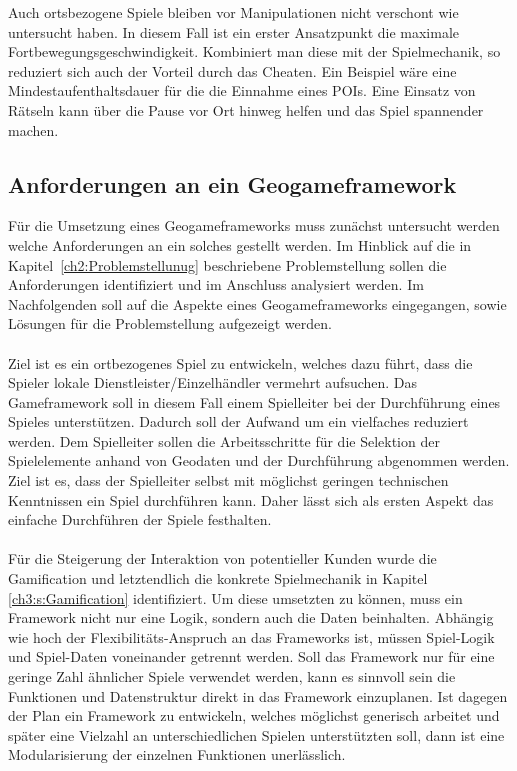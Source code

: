 Auch ortsbezogene Spiele bleiben vor Manipulationen nicht verschont wie \textcite{He.2011} untersucht haben.
In diesem Fall ist ein erster Ansatzpunkt die maximale Fortbewegungsgeschwindigkeit. Kombiniert man diese mit der Spielmechanik, so reduziert sich auch der \glqq Vorteil\grqq{} durch das Cheaten. Ein Beispiel wäre eine Mindestaufenthaltsdauer für die die Einnahme eines POIs.
Eine Einsatz von Rätseln kann über die Pause vor Ort hinweg helfen und das Spiel spannender machen.

\subsection*{Anforderungen an ein Geogameframework}

Für die Umsetzung eines Geogameframeworks muss zunächst untersucht werden welche Anforderungen an ein solches gestellt werden.
Im Hinblick auf die in Kapitel~\ref{ch2:Problemstellunug} beschriebene Problemstellung sollen die Anforderungen  identifiziert und im Anschluss analysiert werden.
Im Nachfolgenden soll auf die Aspekte eines Geogameframeworks eingegangen, sowie Lösungen für die Problemstellung aufgezeigt werden.
\\\\
Ziel ist es ein ortbezogenes Spiel zu entwickeln, welches dazu führt, dass die Spieler lokale Dienstleister/Einzelhändler vermehrt aufsuchen. Das Gameframework soll in diesem Fall einem Spielleiter bei der Durchführung eines Spieles unterstützen. Dadurch soll der Aufwand um ein vielfaches reduziert werden.
Dem Spielleiter sollen die Arbeitsschritte für die Selektion der Spielelemente anhand von Geodaten und der Durchführung abgenommen werden. Ziel ist es, dass der Spielleiter selbst mit möglichst geringen technischen Kenntnissen ein Spiel durchführen kann. Daher lässt sich als ersten Aspekt das einfache Durchführen der Spiele festhalten.
\\\\
Für die Steigerung der Interaktion von potentieller Kunden wurde die Gamification und letztendlich die konkrete Spielmechanik in Kapitel \ref{ch3:s:Gamification} identifiziert.
Um diese umsetzten zu können, muss ein Framework nicht nur eine Logik, sondern auch die Daten beinhalten. Abhängig wie hoch der Flexibilitäts-Anspruch an das Frameworks ist, müssen Spiel-Logik und Spiel-Daten voneinander getrennt werden. Soll das Framework nur für eine geringe Zahl ähnlicher Spiele verwendet werden, kann es sinnvoll sein die Funktionen und Datenstruktur direkt in das Framework einzuplanen. Ist dagegen der Plan ein Framework zu entwickeln, welches möglichst generisch arbeitet und später eine Vielzahl an unterschiedlichen Spielen unterstützten soll, dann ist eine Modularisierung der einzelnen Funktionen unerlässlich.
